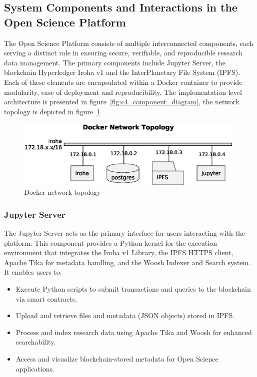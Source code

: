 \documentclass{article}
\begin{document}
\subsection{System Components and Interactions in the Open Science Platform}

The Open Science Platform consists of multiple interconnected components, each serving a distinct role in ensuring secure, verifiable, and reproducible research data management. The primary components include Jupyter Server, the blockchain Hyperledger Iroha v1 and the InterPlanetary File System (IPFS). Each of these elements are encapsulated within a Docker container to provide modularity, ease of deployment and reproducibility. The implementation level architecture is presented in figure~\ref{fig:c4_component_diagram}, the network topology is depicted in figure~\ref{fig:docker_ntw_topology}


\begin{figure}[htbp]
      \centering
      \includegraphics[width=0.98\textwidth, keepaspectratio]{network_topology.eps}
      \caption{Docker network topology}
      \label{fig:docker_ntw_topology}
\end{figure}

\subsubsection{Jupyter Server}
The Jupyter Server acts as the primary interface for users interacting with the platform. This component provides a Python kernel for the execution environment that integrates the Iroha v1 Library, the IPFS HTTPS client, Apache Tika for metadata handling, and the Woosh Indexer and Search system. It enables users to:

\begin{itemize}
      \item Execute Python scripts to submit transactions and queries to the blockchain via smart contracts.
      \item Upload and retrieve files and metadata (JSON objects) stored in IPFS.
      \item Process and index research data using Apache Tika and Woosh for enhanced searchability.
      \item Access and visualize blockchain-stored metadata for Open Science applications.
\end{itemize}
\end{document}
